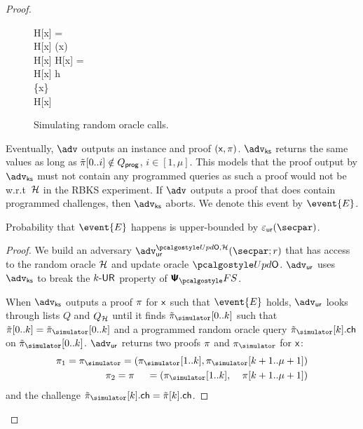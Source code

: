 \begin{proof}
	
	\begin{figure}
		\centering
			\begin{pcvstack}
			\begin{pchstack}
				{
				\pcif H[x] = \bot \pcthen \\
				\pcind H[x] \gets \ro(x) \\
				\pcreturn H[x]
		  		}
				\pchspace
				{ 
					\pcif H[x] = \bot \pcthen \\ 
					\pcind H[x] \gets h \\
					\pcind \Qprog \gets \Qprog \cup \{x\}\\
					\pcreturn H[x]
				}
			\end{pchstack}
		\end{pcvstack}
		\caption{Simulating random oracle calls.}
		\label{fig:simulator_oracles}
	\end{figure}	
%

	Eventually, $\advse$ outputs an instance and proof $(\mathsf{x}, \pi)$. $\advcss$ returns the same values as long as $\tilde{\pi}[0..i] \notin Q_{\mathsf{prog}}$, $i\in[1,\mu]$. This models that the proof output by $\advcss$ must not contain any programmed queries as such a proof would not be w.r.t~$\mathcal{H}$ in the RBKS experiment. If $\advse$ outputs a proof that does contain programmed challenges, then $\advcss$ aborts. We denote this event by $\event{E}$.
	
	\begin{lemma}
		Probability that $\event{E}$ happens is upper-bounded by $\epsur(\secpar)$. 
	\end{lemma}
	\begin{proof}

	We build an adversary $\advur^{\initU, \ro} (\secpar; r)$ that has access to the random oracle $\mathcal{H}$ and update oracle $\initU$. $\advur$ uses $\advcss$ to break the ${k\text{-}\mathsf{UR}}$ property of $\psfs$. 

	When $\advcss$ outputs a proof $\pi$ for $\mathsf{x}$ such that $\event{E}$ holds, $\advur$ looks through lists $Q$ and $Q_{\mathcal{H}}$ until it finds $\tzkproofs[0..k]$ such that $\tzkproof[0..k] = \tzkproofs[0..k]$ and a programmed random oracle query $\tzkproofs[k].\ch$ on $\tzkproofs[0..k]$.	$\advur$ returns two proofs $\pi$ and $\zkproofs$ for $\mathsf{x}$:
		 \begin{align*}
		 \zkproof_1 = \zkproofs =  (\zkproofs[1..k], \zkproofs[k + 1..\mu + 1])\\
		 \zkproof_2 = \zkproof \;\;\;\;\, = (\zkproofs[1..k], \;\;\;\;\zkproof[k + 1..\mu + 1])
		 \end{align*}
		and the challenge $\tzkproofs[k].\ch=\tzkproof[k].\ch$.


\end{proof}
\end{proof}
